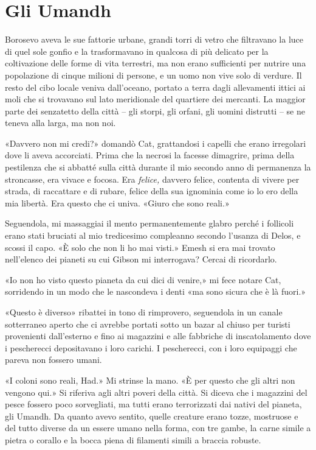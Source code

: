 \chapter{Gli Umandh}

Borosevo aveva le sue fattorie urbane, grandi torri di vetro che
filtravano la luce di quel sole gonfio e la trasformavano in qualcosa di
più delicato per la coltivazione delle forme di vita terrestri, ma non
erano sufficienti per nutrire una popolazione di cinque milioni di
persone, e un uomo non vive solo di verdure. Il resto del cibo locale
veniva dall'oceano, portato a terra dagli allevamenti ittici ai moli che
si trovavano sul lato meridionale del quartiere dei mercanti. La maggior
parte dei senzatetto della città -- gli storpi, gli orfani, gli uomini
distrutti -- se ne teneva alla larga, ma non noi.

«Davvero non mi credi?» domandò Cat, grattandosi i capelli che erano
irregolari dove li aveva accorciati. Prima che la necrosi la facesse
dimagrire, prima della pestilenza che si abbatté sulla città durante il
mio secondo anno di permanenza la stroncasse, era vivace e focosa. Era
\emph{felice,} davvero felice, contenta di vivere per strada, di
raccattare e di rubare, felice della sua ignominia come io lo ero della
mia libertà. Era questo che ci univa. «Giuro che sono reali.»

Seguendola, mi massaggiai il mento permanentemente glabro perché i
follicoli erano stati bruciati al mio tredicesimo compleanno secondo
l'usanza di Delos, e scossi il capo. «È solo che non li ho mai visti.»
Emesh si era mai trovato nell'elenco dei pianeti su cui Gibson mi
interrogava? Cercai di ricordarlo.

«Io non ho visto questo pianeta da cui dici di venire,» mi fece notare
Cat, sorridendo in un modo che le nascondeva i denti «ma sono sicura che
è là fuori.»

«Questo è diverso» ribattei in tono di rimprovero, seguendola in un
canale sotterraneo aperto che ci avrebbe portati sotto un bazar al
chiuso per turisti provenienti dall'esterno e fino ai magazzini e alle
fabbriche di inscatolamento dove i pescherecci depositavano i loro
carichi. I pescherecci, con i loro equipaggi che pareva non fossero
umani.

«I coloni sono reali, Had.» Mi strinse la mano. «È per questo che gli
altri non vengono qui.» Si riferiva agli altri poveri della città. Si
diceva che i magazzini del pesce fossero poco sorvegliati, ma tutti
erano terrorizzati dai nativi del pianeta, gli Umandh. Da quanto avevo
sentito, quelle creature erano tozze, mostruose e del tutto diverse da
un essere umano nella forma, con tre gambe, la carne simile a pietra o
corallo e la bocca piena di filamenti simili a braccia robuste.

